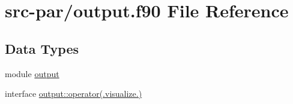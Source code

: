 \hypertarget{output_8f90}{\section{src-\/par/output.f90 File Reference}
\label{output_8f90}
}
\subsection*{Data Types}
\begin{DoxyCompactItemize}
\item 
module \hyperlink{classoutput}{output}
\item 
interface \hyperlink{interfaceoutput_1_1operator_07_8visualize_8_08}{output\-::operator(.\-visualize.)}
\end{DoxyCompactItemize}
